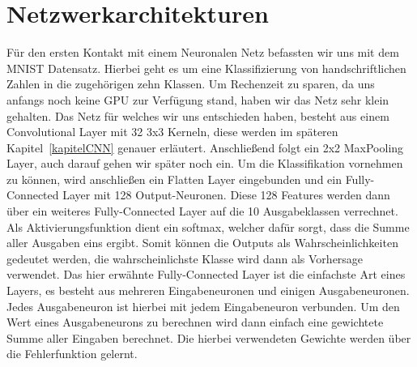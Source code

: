 \section{Netzwerkarchitekturen}
Für den ersten Kontakt mit einem Neuronalen Netz befassten wir uns mit dem MNIST Datensatz. Hierbei geht es um eine Klassifizierung von handschriftlichen Zahlen in die zugehörigen zehn Klassen. Um Rechenzeit zu sparen, da uns anfangs noch keine GPU zur Verfügung stand, haben wir das Netz sehr klein gehalten. Das Netz für welches wir uns entschieden haben, besteht aus einem Convolutional Layer mit 32 3x3 Kerneln, diese werden im späteren Kapitel~\ref{kapitelCNN} genauer erläutert. Anschließend folgt ein 2x2 MaxPooling Layer, auch darauf gehen wir später noch ein. Um die Klassifikation vornehmen zu können, wird anschließen ein Flatten Layer eingebunden und ein Fully-Connected Layer mit 128 Output-Neuronen. Diese 128 Features werden dann über ein weiteres Fully-Connected Layer auf die 10 Ausgabeklassen verrechnet. Als Aktivierungsfunktion dient ein softmax, welcher dafür sorgt, dass die Summe aller Ausgaben eins ergibt. Somit können die Outputs als Wahrscheinlichkeiten gedeutet werden, die wahrscheinlichste Klasse wird dann als Vorhersage verwendet.
Das hier erwähnte Fully-Connected Layer ist die einfachste Art eines Layers, es besteht aus mehreren Eingabeneuronen und einigen Ausgabeneuronen. Jedes Ausgabeneuron ist hierbei mit jedem Eingabeneuron verbunden. Um den Wert eines Ausgabeneurons zu berechnen wird dann einfach eine gewichtete Summe aller Eingaben berechnet. Die hierbei verwendeten Gewichte werden über die Fehlerfunktion gelernt.

